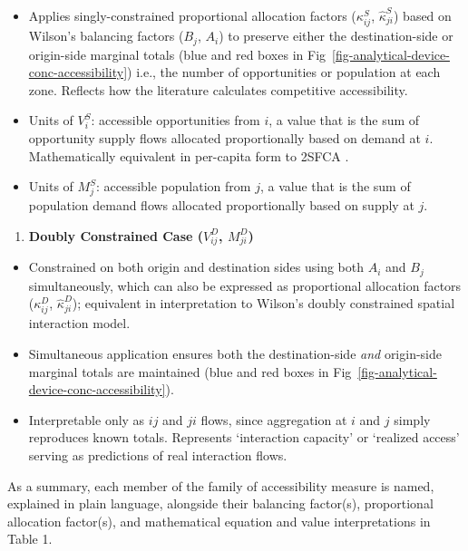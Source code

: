 \documentclass[
  10pt,
  letterpaper,
]{article}
\providecommand{\tightlist}{%
  \setlength{\itemsep}{0pt}\setlength{\parskip}{0pt}}
\begin{document}
\begin{itemize}
\tightlist
\item
  Applies singly-constrained proportional allocation factors
  (\(\kappa_{ij}^S\), \(\hat \kappa_{ji}^S\)) based on Wilson's
  balancing factors (\(B_j\), \(A_i\)) to preserve either the
  destination-side or origin-side marginal totals (blue and red boxes in
  Fig~\ref{fig-analytical-device-conc-accessibility}) i.e., the number
  of opportunities or population at each zone. Reflects how the
  literature calculates competitive accessibility.
\item
  Units of \(V_i^S\): accessible opportunities from \(i\), a value that
  is the sum of opportunity supply flows allocated proportionally based
  on demand at \(i\). Mathematically equivalent in per-capita form to
  2SFCA \citep{luo2003}.
\item
  Units of \(M_j^S\): accessible population from \(j\), a value that is
  the sum of population demand flows allocated proportionally based on
  supply at \(j\).
\end{itemize}

\begin{enumerate}
\def\labelenumi{\arabic{enumi}.}
\setcounter{enumi}{3}
\tightlist
\item
  \textbf{Doubly Constrained Case (\(V_{ij}^D\), \(M_{ji}^D\))}
\end{enumerate}

\begin{itemize}
\tightlist
\item
  Constrained on both origin and destination sides using both \(A_i\)
  and \(B_j\) simultaneously, which can also be expressed as
  proportional allocation factors (\(\kappa_{ij}^D\),
  \(\hat \kappa_{ji}^D\)); equivalent in interpretation to Wilson's
  \citep{wilson1971} doubly constrained spatial interaction model.
\item
  Simultaneous application ensures both the destination-side \emph{and}
  origin-side marginal totals are maintained (blue and red boxes in
  Fig~\ref{fig-analytical-device-conc-accessibility}).
\item
  Interpretable only as \(ij\) and \(ji\) flows, since aggregation at
  \(i\) and \(j\) simply reproduces known totals. Represents
  `interaction capacity' or `realized access' serving as predictions of
  real interaction flows.
\end{itemize}

As a summary, each member of the family of accessibility measure is
named, explained in plain language, alongside their balancing factor(s),
proportional allocation factor(s), and mathematical equation and value
interpretations in Table 1.
\end{document}
